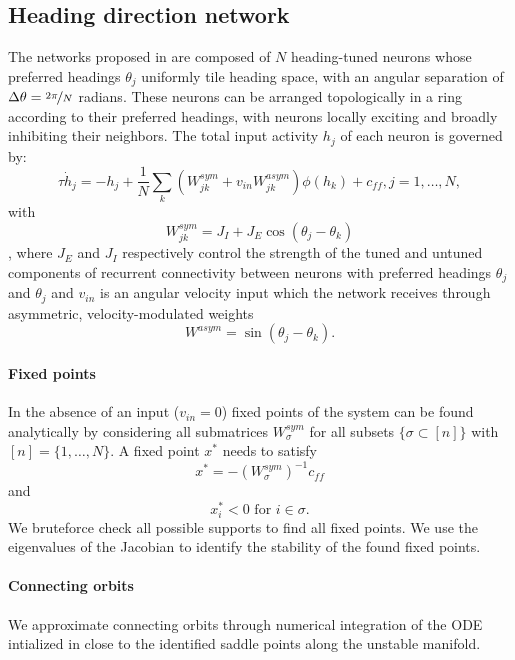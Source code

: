\documentclass{article} %
\newcounter{ct}
\theoremstyle{definition}
\theoremstyle{remark}
\begin{document}
\subsection{Heading direction network}\label{sec:supp:headdirection}
The networks proposed in \citep{Noorman2022} are composed of \(N\) heading-tuned neurons whose preferred headings \(\theta_{j}\) uniformly tile heading space, with an angular separation of \(\Delta\theta=\nicefrac{2\pi}{N}\) radians.
These neurons can be arranged topologically in a ring according to their preferred headings, with neurons locally exciting and broadly inhibiting their neighbors.
The total input activity \(h_{j}\) of each neuron is governed by:
\begin{equation}
\tau \dot h_{j} = -h_{j} + \frac{1}{N} \sum_{k} (W_{jk}^{sym} + v_{in} W_{jk}^{asym})\phi(h_{k})+c_{ff},     j = 1,\dots, N,
\end{equation}with
\begin{equation}
W_{jk}^{sym} = J_{I} + J_{E} \cos(\theta_{j} - \theta_{k})
\end{equation}, where \(J_{E}\) and \(J_{I}\) respectively control the strength of the tuned and untuned components of recurrent connectivity between neurons with preferred headings \(\theta_{j}\) and \(\theta_{j}\)
and \(v_{in}\) is an angular velocity input which the network receives through asymmetric, velocity-modulated weights \begin{equation}W^{asym} =\sin(\theta_{j} - \theta_{k}).\end{equation}
\paragraph{Fixed points}
In the absence of an input (\(v_{in}=0\)) fixed points of the system can be found analytically by considering all submatrices \(W_{\sigma}^{sym}\) for all subsets \(\{\sigma\subset [n]\}\) with\([n]=\{1,\dots, N\}\).
A fixed point \(x^*\) needs to satisfy
\begin{equation}
x^*= -(W_{\sigma}^{sym})^{-1}c_{ff}
\end{equation}and
\begin{equation}
x^*_{i}<0 \text{   for  	 } i\in\sigma.
\end{equation}
We bruteforce check all possible supports to find all fixed points.
We use the eigenvalues of the Jacobian to identify the stability of the found fixed points.

\paragraph{Connecting orbits}
We approximate connecting orbits through numerical integration of the ODE intialized in close to the identified saddle points along the unstable manifold.
\end{document}
